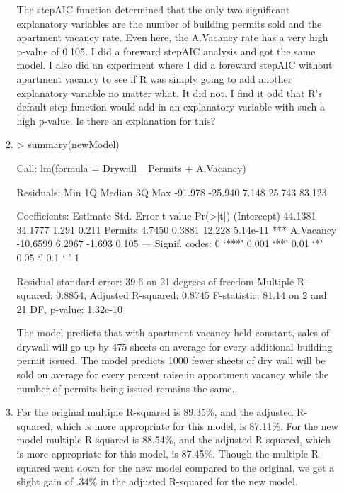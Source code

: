 \documentclass[]{article}
\begin{document}
\begin{enumerate}
\begin{enumerate}
The stepAIC function determined that the only two significant explanatory variables are the number of building permits sold and the apartment vacancy rate. Even here, the A.Vacancy rate has a very high p-value of 0.105. I did a foreward stepAIC analysis and got the same model. I also did an experiment where I did a foreward stepAIC without apartment vacancy to see if R was simply going to add another explanatory variable no matter what. It did not. I find it odd that R's default step function would add in an explanatory variable with such a high p-value. Is there an explanation for this?

\item

\begin{Schunk}
\begin{Sinput}
> summary(newModel)
\end{Sinput}
\begin{Soutput}
Call:
lm(formula = Drywall ~ Permits + A.Vacancy)

Residuals:
    Min      1Q  Median      3Q     Max 
-91.978 -25.940   7.148  25.743  83.123 

Coefficients:
            Estimate Std. Error t value Pr(>|t|)    
(Intercept)  44.1381    34.1777   1.291    0.211    
Permits       4.7450     0.3881  12.228 5.14e-11 ***
A.Vacancy   -10.6599     6.2967  -1.693    0.105    
---
Signif. codes:  0 ‘***’ 0.001 ‘**’ 0.01 ‘*’ 0.05 ‘.’ 0.1 ‘ ’ 1

Residual standard error: 39.6 on 21 degrees of freedom
Multiple R-squared:  0.8854,	Adjusted R-squared:  0.8745 
F-statistic: 81.14 on 2 and 21 DF,  p-value: 1.32e-10
\end{Soutput}
\end{Schunk}

The model predicts that with apartment vacancy held constant, sales of drywall will go up by 475 sheets on average for every additional building permit issued. The model predicts 1000 fewer sheets of dry wall will be sold on average for every percent raise in appartment vacancy while the number of permits being issued remains the same. 

\item

For the original multiple R-squared is 89.35\%, and the adjusted R-squared, which is more appropriate for this model, is 87.11\%.
For the new model multiple R-squared is 88.54\%, and the adjusted R-squared, which is more appropriate for this model, is 87.45\%.
Though the multiple R-squared went down for the new model compared to the original, we get a slight gain of .34\% in the adjusted R-squared for the new model.


\end{enumerate}
\end{enumerate}
\end{document}
